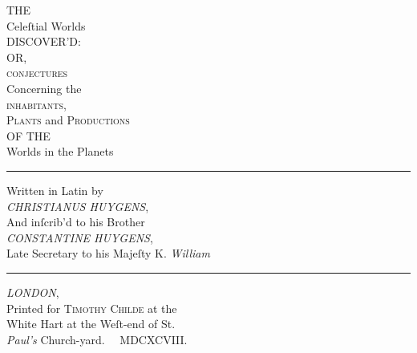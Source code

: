 \documentclass[letterpaper]{book}
\begin{document}
\frontmatter

\thispagestyle{empty}

\begin{titlepage}
	\begin{center}
\LARGE THE \\
\small \phantom{bla bla}
{\fontsize{42}{42} Celeſtial Worlds} \\
\small \phantom{bla bla}
\LARGE DISCOVER'D: \\
OR, \\
\fontsize{36}{36}  \textsc{conjectures} \\
\fontsize{20}{36}  Concerning the \\
\fontsize{36}{36}  \textsc{inhabitants,} \\
\tiny \phantom{bla bla}
\fontsize{20}{24}  \textsc{Plants} and \textsc{Productions} \\
\scriptsize 
\phantom{blabla}
\Large OF THE \\
\large \phantom{blabla}
{\fontsize{42}{36} Worlds in the Planets} \\
\phantom{bla bla}
\hrule
\phantom{bla bla}
\Large
Written in Latin by \\
\emph{CHRISTIANUS HUYGENS}, \\
And inſcrib'd to his Brother \\
\emph{CONSTANTINE HUYGENS}, \\
Late Secretary to his Majeſty K. \emph{William} \\
\phantom{bla bla}
\hrule
\phantom{bla bla}
\textsc{\emph {LONDON}}, \\
Printed for \textsc{Timothy Childe} at the \\
White Hart at the Weſt-end of St. \\
\emph{Paul's} Church-yard. \, \, MDCXCVIII.
\end{center}
\end{titlepage}
\end{document}
